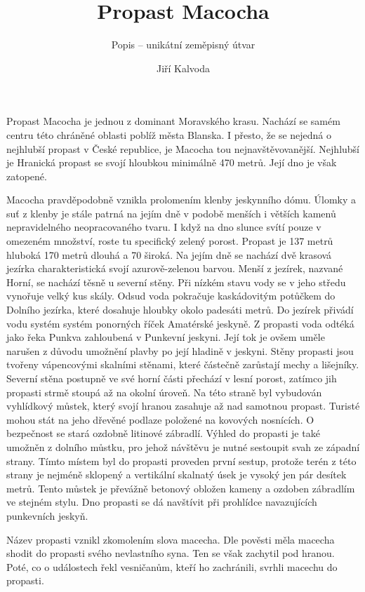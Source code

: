 \documentclass{article}
\author{Jiří Kalvoda}
\date{}
\title{Propast Macocha}
\subtitle{Popis -- unikátní zeměpisný útvar}
\begin{document}
\maketitle
Propast Macocha je jednou z dominant Moravského krasu.
Nachází se samém centru této chráněné oblasti poblíž města Blanska.
I přesto, že se nejedná o nejhlubší propast v České republice, je Macocha tou nejnavštěvovanější.
Nejhlubší je Hranická propast se svojí hloubkou minimálně 470 metrů.
Její dno je však zatopené.


Macocha pravděpodobně vznikla prolomením klenby jeskynního dómu.
Úlomky a suť z klenby je stále patrná na jejím dně v podobě menších i větších kamenů nepravidelného neopracovaného tvaru.
I když na dno slunce svítí pouze v omezeném množství, roste tu specifický zelený porost.
Propast je 137 metrů hluboká 170 metrů dlouhá a 70 široká.
Na jejím dně se nachází dvě krasová jezírka charakteristická svojí azurově-zelenou barvou.
Menší z jezírek, nazvané Horní, se nachází těsně u severní stěny. Při nízkém stavu vody se v jeho středu vynořuje velký kus skály. Odsud voda pokračuje kaskádovitým potůčkem do Dolního jezírka, které dosahuje hloubky okolo padesáti metrů.
Do jezírek přivádí vodu systém systém ponorných říček Amatérské jeskyně.
Z propasti voda odtéká jako řeka Punkva zahloubená v Punkevní jeskyni.
Její tok je ovšem uměle narušen z důvodu umožnění plavby po její hladině v jeskyni.
Stěny propasti jsou tvořeny vápencovými skalními stěnami, které částečně zarůstají mechy a lišejníky.
Severní stěna postupně ve své horní části přechází v lesní porost, zatímco jih propasti strmě stoupá až na okolní úroveň.
Na této straně byl vybudován vyhlídkový můstek, který svojí hranou zasahuje až nad samotnou propast.
Turisté mohou stát na jeho dřevěné podlaze položené na kovových nosnících.
O bezpečnost se stará ozdobně litinové zábradlí.
Výhled do propasti je také umožněn z dolního můstku, pro jehož návštěvu je nutné sestoupit svah ze západní strany.
Tímto místem byl do propasti proveden první sestup, protože terén z této strany je nejméně sklopený a vertikální skalnatý úsek je vysoký jen pár desítek metrů.
Tento můstek je převážně betonový obložen kameny a ozdoben zábradlím ve stejném stylu.
Dno propasti se dá navštívit při prohlídce navazujících punkevních jeskyň.


Název propasti vznikl zkomolením slova macecha. Dle pověsti měla macecha shodit do propasti svého nevlastního syna.
Ten se však zachytil pod hranou. Poté, co o událostech řekl vesničanům, kteří ho zachránili, svrhli macechu do propasti.
\end{document}
